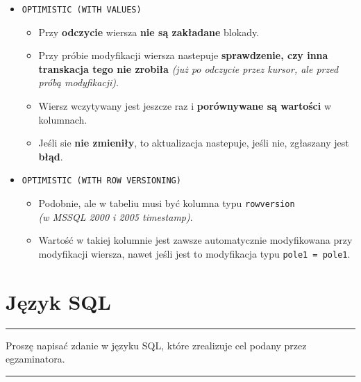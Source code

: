 \documentclass[a5paper,6pt]{article}
\newcommand{\horrule}[1]{\rule{\linewidth}{#1}}
\begin{document}
\begin{itemize}
        \item \texttt{OPTIMISTIC (WITH VALUES)}
        \begin{itemize}
            \item Przy \textbf{odczycie} wiersza \textbf{nie są zakładane}
                  blokady.
            \item Przy próbie modyfikacji wiersza nastepuje
                  \textbf{sprawdzenie, czy inna\\ transkacja tego nie zrobiła}
                  \textit{(już po odczycie
                  przez kursor, ale przed próbą modyfikacji)}.
            \item Wiersz wczytywany jest jeszcze raz i \textbf{porównywane są
                  wartości} w kolumnach.
            \item Jeśli sie \textbf{nie zmieniły}, to aktualizacja nastepuje,
                  jeśli nie, zgłaszany jest \textbf{błąd}.
        \end{itemize}

        \pagebreak
        \item \texttt{OPTIMISTIC (WITH ROW VERSIONING)}
        \begin{itemize}
            \item Podobnie, ale w tabeliu musi być kolumna typu
                  \texttt{rowversion}\\
                  \textit{(w MSSQL 2000 i 2005 timestamp)}.
            \item Wartość w takiej kolumnie jest zawsze automatycznie
                  modyfikowana przy modyfikacji wiersza, nawet jeśli jest to
                  modyfikacja typu \texttt{pole1 = pole1}.
        \end{itemize}

    \end{itemize}



\pagebreak

    \section{Język SQL} %
    \label{sec:jezyk_sql}

    \horrule{0.5pt}
    Proszę napisać zdanie w języku SQL, które zrealizuje cel podany przez
    egzaminatora.\\
    \horrule{0.5pt}
\end{document}
